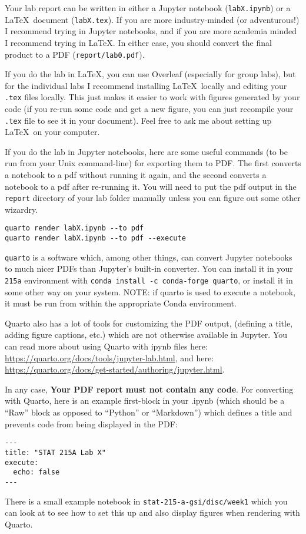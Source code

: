 \documentclass[letterpaper,12pt]{article}
\begin{document}
Your lab report can be written in either a Jupyter notebook (\texttt{labX.ipynb}) or a \LaTeX\ document (\texttt{labX.tex}). If you are more industry-minded (or adventurous!) I recommend trying in Jupyter notebooks, and if you are more academia minded I recommend trying in \LaTeX. In either case, you should convert the final product to a PDF (\texttt{report/lab0.pdf}).

If you do the lab in \LaTeX, you can use Overleaf (especially for group labs), but for the individual labs I recommend installing \LaTeX\ locally and editing your \texttt{.tex} files locally. This just makes it easier to work with figures generated by your code (if you re-run some code and get a new figure, you can just recompile your \texttt{.tex} file to see it in your document). Feel free to ask me about setting up \LaTeX\ on your computer.

If you do the lab in Jupyter notebooks, here are some useful commands (to be run from your Unix command-line) for exporting them to PDF. The first converts a notebook to a pdf without running it again, and the second converts a notebook to a pdf after re-running it. You will need to put the pdf output in the \texttt{report} directory of your lab folder manually unless you can figure out some other wizardry.
\begin{verbatim}
quarto render labX.ipynb --to pdf
quarto render labX.ipynb --to pdf --execute
\end{verbatim}
\texttt{quarto} is a software which, among other things, can convert Jupyter notebooks to much nicer PDFs than Jupyter's built-in converter. You can install it in your \texttt{215a} environment with \texttt{conda install -c conda-forge quarto}, or install it in some other way on your system. NOTE: if quarto is used to execute a notebook, it must be run from within the appropriate Conda environment.

Quarto also has a lot of tools for customizing the PDF output, (defining a title, adding figure captions, etc.) which are not otherwise available in Jupyter. You can read more about using Quarto with ipynb files here: \url{https://quarto.org/docs/tools/jupyter-lab.html}, and here: \url{https://quarto.org/docs/get-started/authoring/jupyter.html}.

In any case, \textbf{Your PDF report must not contain any code}. For converting with Quarto, here is an example first-block in your .ipynb (which should be a ``Raw'' block as opposed to ``Python'' or ``Markdown'') which defines a title and prevents code from being displayed in the PDF:
\begin{verbatim}
---
title: "STAT 215A Lab X"
execute:
  echo: false
---
\end{verbatim}
There is a small example notebook in \texttt{stat-215-a-gsi/disc/week1} which you can look at to see how to set this up and also display figures when rendering with Quarto.
\end{document}
